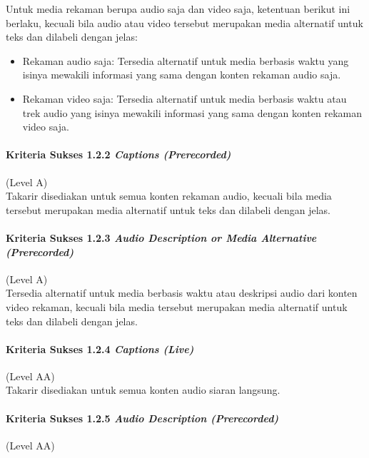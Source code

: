 Untuk media rekaman berupa audio saja dan video saja, ketentuan berikut ini berlaku, kecuali bila audio atau video tersebut merupakan media alternatif untuk teks dan dilabeli dengan jelas:
\begin{itemize}
	\item Rekaman audio saja: Tersedia alternatif untuk media berbasis waktu yang isinya mewakili informasi yang sama dengan konten rekaman audio saja.
	\item Rekaman video saja: Tersedia alternatif untuk media berbasis waktu atau trek audio yang isinya mewakili informasi yang sama dengan konten rekaman video saja.
\end{itemize}

\paragraph{Kriteria Sukses 1.2.2 \textit{Captions (Prerecorded)}}
\label{sec:kriteria_sukses_1.2.2}
(Level A)\\

Takarir disediakan untuk semua konten rekaman audio, kecuali bila media tersebut merupakan media alternatif untuk teks dan dilabeli dengan jelas.

\paragraph{Kriteria Sukses 1.2.3 \textit{Audio Description or Media Alternative (Prerecorded)}}
\label{sec:kriteria_sukses_1.2.3}
(Level A)\\

Tersedia alternatif untuk media berbasis waktu atau deskripsi audio dari konten video rekaman, kecuali bila media tersebut merupakan media alternatif untuk teks dan dilabeli dengan jelas.

\paragraph{Kriteria Sukses 1.2.4 \textit{Captions (Live)}}
\label{sec:kriteria_sukses_1.2.4}
(Level AA)\\

Takarir disediakan untuk semua konten audio siaran langsung.

\paragraph{Kriteria Sukses 1.2.5 \textit{Audio Description (Prerecorded)}}
\label{sec:kriteria_sukses_1.2.5}
(Level AA)\\

